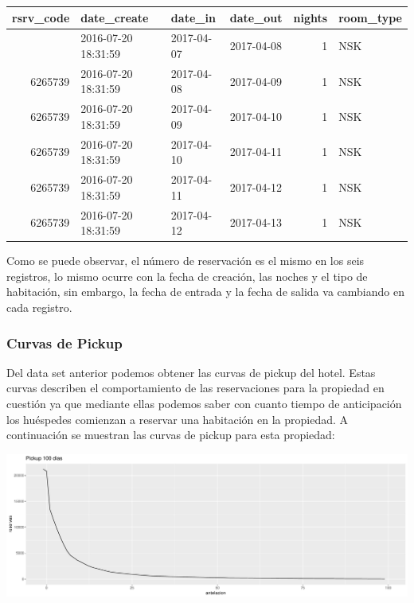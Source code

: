 \begin{knitrout}
\color{fgcolor}\begin{table}[H]
\centering{}

\begin{tabular}{r|l|l|l|r|l}
\hiderowcolors
\hline
rsrv\_code & date\_create & date\_in & date\_out & nights & room\_type\\
\hline
\showrowcolors
6265739 & 2016-07-20 18:31:59 & 2017-04-07 & 2017-04-08 & 1 & NSK\\
\hline
6265739 & 2016-07-20 18:31:59 & 2017-04-08 & 2017-04-09 & 1 & NSK\\
\hline
6265739 & 2016-07-20 18:31:59 & 2017-04-09 & 2017-04-10 & 1 & NSK\\
\hline
6265739 & 2016-07-20 18:31:59 & 2017-04-10 & 2017-04-11 & 1 & NSK\\
\hline
6265739 & 2016-07-20 18:31:59 & 2017-04-11 & 2017-04-12 & 1 & NSK\\
\hline
6265739 & 2016-07-20 18:31:59 & 2017-04-12 & 2017-04-13 & 1 & NSK\\
\hline
\end{tabular}
\end{table}
\end{knitrout}

Como se puede observar, el número de reservación es el mismo en los seis registros, lo mismo ocurre con la fecha de creación, las noches y el tipo de habitación, sin embargo, la fecha de entrada y la fecha de salida va cambiando en cada registro.

\subsubsection*{Curvas de Pickup}

Del data set anterior podemos obtener las curvas de pickup del hotel. Estas curvas describen el comportamiento de las reservaciones para la propiedad en cuestión ya que mediante ellas podemos saber con cuanto tiempo de anticipación los huéspedes comienzan a reservar una habitación en la propiedad. A continuación se muestran las curvas de pickup para esta propiedad:

\color{fgcolor}
\includegraphics[width=\maxwidth]{Figures/pickup-1} 

